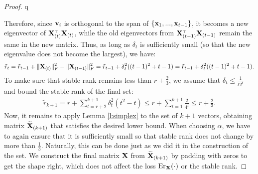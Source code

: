 \documentclass{article}
\begin{document}
\begin{proof}
q
	
	Therefore, since $\mathbf v_i$ is orthogonal to the span of $\{\mathbf x_{1},...,\mathbf x_{t-1}\}$,
	it becomes a new eigenvector of $\X_{(t)}^\top\X_{(t)}$, while the old
	eigenvectors from $\X_{(t-1)}^\top\X_{(t-1)}$ remain the same in the
	new matrix. Thus, as long as $\delta_t$ is sufficiently small (so that
	the new eigenvalue does not become the largest), we have:
	\begin{align*}
	\tilde r_{t} = \tilde r_{t-1} + \|\mathbf X_{(t)}\|_F^2
	-\|\mathbf X_{(t-1)}\|_F^2=\tilde r_{t-1} + \delta_t^2((t-1)^2+t-1) = \tilde r_{t-1} + \delta_t^2((t-1)^2+t-1).
	\end{align*}
	To make sure that stable rank remains less than $r+\frac23$, we
	assume that $\delta_t\leq\frac1{t2^{t}}$ and bound the stable rank of the final set:
	\begin{align*}
	\tilde r_{k+1} = r + \sum_{t=r+2}^{k+1} \delta_t^2 (t^2-t) \leq r +
	\sum_{t=1}^{k+1}\frac2{4^t}\leq r + \frac23.
	\end{align*}
	Now, it remains to apply Lemma \ref{l:simplex} to the set
	of $k+1$ vectors, obtaining matrix $\widetilde{\mathbf{X}}_{(k+1)}$ that satisfies the
	desired lower bound. When choosing
	$\alpha$, we have to again ensure that it 
	is sufficiently small so that stable rank does not change by
	more than $\frac13$. Naturally, this can be done just as we did it
	in the construction of the set. We construct the final matrix $\mathbf X$
	from $\widetilde{\mathbf{X}}_{(k+1)}$ by padding with zeros to get the shape right,
	which does not affect the loss $\mathrm{Er}_{\mathbf X}(\cdot)$ or the stable rank. 
\end{proof}


  
  

  
\end{document}
